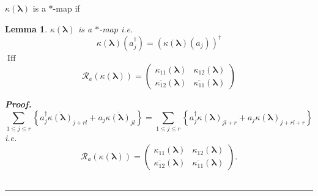 \documentclass[aps, preprint]{revtex4}
\newtheorem{lemma}[theorem]{Lemma}
\newenvironment{proof}[1][Proof]{\noindent\textbf{#1.} }{\ \rule{0.5em}{0.5em}}
\begin{document}
$\kappa  \left (\mathbf{\lambda }\right )$ is a $ \ast $-map if 


\begin{lemma}
$\kappa  \left (\mathbf{\lambda }\right )$ is a $ \ast $-map i.e.
\begin{equation}\kappa  \left (\mathbf{\lambda }\right ) \left (a_{j}^{ \dag }\right ) =\left (\kappa  \left (\mathbf{\lambda }\right ) \left (a_{j}\right )\right )^{ \dag }
\end{equation}$\ensuremath{\operatorname*{Iff}}$
\begin{equation}\mathcal{R}_{a} \left (\kappa  \left (\mathbf{\lambda }\right )\right ) =\left (\begin{array}{cc}\kappa _{1 1} \left (\mathbf{\lambda }\right ) & \kappa _{1 2} \left (\mathbf{\lambda }\right ) \\
\overline{\kappa _{1 2}} \left (\mathbf{\lambda }\right ) & \overline{\kappa _{1 1}} \left (\mathbf{\lambda }\right )\end{array}\right )
\end{equation}


\begin{proof}
\begin{equation}\sum _{1 \leq j \leq r}\left \{a_{j}^{ \dag } \overline{\kappa  \left (\mathbf{\lambda }\right )}_{j +r l} +a_{j} \overline{\kappa  \left (\mathbf{\lambda }\right )}_{j l}\right \} =\sum _{1 \leq j \leq r}\left \{a_{j}^{ \dag } \kappa  \left (\mathbf{\lambda }\right )_{j l +r} +a_{j} \kappa  \left (\mathbf{\lambda }\right )_{j +r l +r}\right \}
\end{equation}i.e.
\begin{equation}\mathcal{R}_{a} \left (\kappa  \left (\mathbf{\lambda }\right )\right ) =\left (\begin{array}{cc}\kappa _{1 1} \left (\mathbf{\lambda }\right ) & \kappa _{1 2} \left (\mathbf{\lambda }\right ) \\
\overline{\kappa _{1 2}} \left (\mathbf{\lambda }\right ) & \overline{\kappa _{1 1}} \left (\mathbf{\lambda }\right )\end{array}\right )\text{.}
\end{equation}
\end{proof}


\end{lemma}
\end{document}
